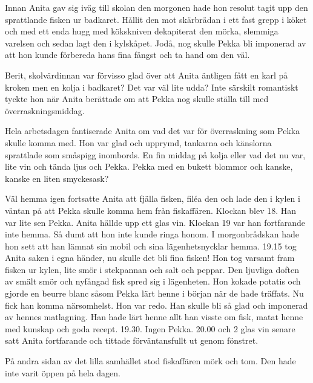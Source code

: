 Innan Anita gav sig iväg till skolan den morgonen hade hon resolut tagit upp den sprattlande fisken ur badkaret. Hållit den mot skärbrädan i ett fast grepp i köket och med ett enda hugg med kökskniven dekapiterat den mörka, slemmiga varelsen och sedan lagt den i kylskåpet. Jodå, nog skulle Pekka bli imponerad av att hon kunde förbereda hans fina fångst och ta hand om den väl. 

Berit, skolvärdinnan var förvisso glad över att Anita äntligen fått en karl på kroken men en kolja i badkaret? Det var väl lite udda? Inte särskilt romantiskt tyckte hon när Anita berättade om att Pekka nog skulle ställa till med överraskningsmiddag. 

Hela arbetsdagen fantiserade Anita om vad det var för överraskning som Pekka skulle komma med. Hon var glad och upprymd, tankarna och känslorna sprattlade som småspigg inombords. En fin middag på kolja eller vad det nu var, lite vin och tända ljus och Pekka. Pekka med en bukett blommor och kanske, kanske en liten smyckesask?

Väl hemma igen fortsatte Anita att fjälla fisken, filéa den och lade den i kylen i väntan på att Pekka skulle komma hem från fiskaffären. Klockan blev 18. Han var lite sen Pekka. Anita hällde upp ett glas vin. Klockan 19 var han fortfarande inte hemma. Så dumt att hon inte kunde ringa honom. I morgonbrådskan hade hon sett att han lämnat sin mobil och sina lägenhetsnycklar hemma. 19.15 tog Anita saken i egna händer, nu skulle det bli fina fisken! Hon tog varsamt fram fisken ur kylen, lite smör i stekpannan och salt och peppar. Den ljuvliga doften av smält smör och nyfångad fisk spred sig i lägenheten. Hon kokade potatis och gjorde en beurre blanc såsom Pekka lärt henne i början när de hade träffats. Nu fick han komma närsomhelst. Hon var redo. Han skulle bli så glad och imponerad av hennes matlagning. Han hade lärt henne allt han visste om fisk, matat henne med kunskap och goda recept. 19.30. Ingen Pekka. 20.00 och 2 glas vin senare satt Anita fortfarande och tittade förväntansfullt ut genom fönstret. 

På andra sidan av det lilla samhället stod fiskaffären mörk och tom. Den hade inte varit öppen på hela dagen.
